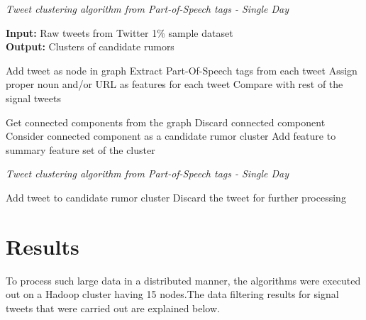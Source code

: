 \begin{algorithm}[H]
	\caption{\em Tweet clustering algorithm from Part-of-Speech tags - Single Day }
	\textbf{Input:} Raw tweets from Twitter 1\% sample dataset \\
	\textbf{Output:} Clusters of candidate rumors 
	\begin{algorithmic}[1]	 	
		\ELSE 
		\ENDIF
		\ENDFOR    
		
		\STATE Add tweet as node in graph 
		\STATE	 Extract Part-Of-Speech tags from each tweet 
		\STATE	 Assign proper noun and/or URL as features for each tweet
		\STATE	 Compare with rest of the signal tweets
		
		\ENDIF
		\ENDFOR
		\STATE Get connected components from the graph
		\STATE Discard connected component
		\ELSE
		\STATE Consider connected component as a candidate rumor cluster
		\ENDIF
		\STATE Add feature to summary feature set of the cluster 
		\ENDIF
		\ENDFOR
		\ENDFOR
	\end{algorithmic}
	\addtocounter{algorithm}{-1}%
\end{algorithm}

\begin{algorithm}[H]
	\caption{\em Tweet clustering algorithm from Part-of-Speech tags - Single Day}
	\begin{algorithmic}[1]
		\STATE Add tweet to candidate rumor cluster 
		\ELSE
		\STATE Discard the tweet for further processing 
		\ENDIF 
		\ENDFOR
		\ENDFOR 
	\end{algorithmic}
\end{algorithm}

		\section{Results}
		To process such large data in a distributed manner, the algorithms were executed out on a Hadoop cluster having 15 nodes.The data filtering results for signal tweets that were carried out are explained below.
		
